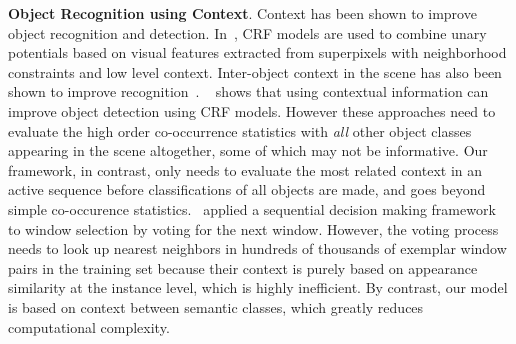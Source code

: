 {\bf Object Recognition using Context}. 
Context has been shown to improve object recognition and detection. In~\cite{shotton2006textonboost, ladicky2010graph}, CRF models are used to combine unary potentials based on visual features extracted from superpixels with neighborhood constraints and low level context. Inter-object context in the scene has also been shown to improve recognition~\cite{galleguillos2010context, chen2011piecing}.
~\cite{mottaghi2014role} shows that using contextual information can improve object detection using CRF models. However these approaches need to evaluate the high order co-occurrence statistics with \emph{all} other object classes appearing in the scene altogether, some of which may not be informative. Our framework, in contrast, only needs to evaluate the most related context in an active sequence before classifications of all objects are made, and goes beyond simple co-occurence statistics.~\cite{bogdan2012context} applied a sequential decision making framework to window selection by voting for the next window. However, the voting process needs to look up nearest neighbors in hundreds of thousands of exemplar window pairs in the training set because their context is purely based on appearance similarity at the instance level, which is highly inefficient. By contrast, our model is based on context between semantic classes,  which greatly reduces computational complexity.

